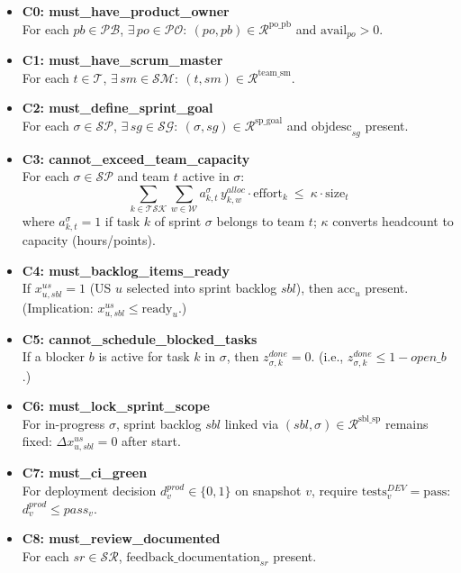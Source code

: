 \documentclass[11pt,a4paper]{article}
\begin{document}
\begin{itemize}[leftmargin=2em]
  \item \textbf{C0: must\_have\_product\_owner} \\
  For each $pb\in\mathcal{PB}$, $\exists\, po\in\mathcal{PO}:\ (po,pb)\in\mathcal{R}^{\text{po\_pb}}$ and $\text{avail}_{po}>0$.
  \item \textbf{C1: must\_have\_scrum\_master} \\
  For each $t\in\mathcal{T}$, $\exists\, sm\in\mathcal{SM}:\ (t,sm)\in\mathcal{R}^{\text{team\_sm}}$.
  \item \textbf{C2: must\_define\_sprint\_goal} \\
  For each $\sigma\in\mathcal{SP}$, $\exists\, sg\in\mathcal{SG}:\ (\sigma,sg)\in\mathcal{R}^{\text{sp\_goal}}$ and $\text{objdesc}_{sg}$ present.
  \item \textbf{C3: cannot\_exceed\_team\_capacity} \\
  For each $\sigma\in\mathcal{SP}$ and team $t$ active in $\sigma$:
  \[
  \sum_{k\in\mathcal{TSK}} \sum_{w\in\mathcal{W}} a^{\sigma}_{k,t}\, y^{alloc}_{k,w} \cdot \text{effort}_k \ \le\ \kappa \cdot \text{size}_t
  \]
  where $a^{\sigma}_{k,t}=1$ if task $k$ of sprint $\sigma$ belongs to team $t$; $\kappa$ converts headcount to capacity (hours/points).
  \item \textbf{C4: must\_backlog\_items\_ready} \\
  If $x^{us}_{u,sbl}=1$ (US $u$ selected into sprint backlog $sbl$), then $\text{acc}_u$ present. (Implication: $x^{us}_{u,sbl} \le \text{ready}_u$.)
  \item \textbf{C5: cannot\_schedule\_blocked\_tasks} \\
  If a blocker $b$ is active for task $k$ in $\sigma$, then $z^{done}_{\sigma,k}=0$. (i.e., $z^{done}_{\sigma,k} \le 1-open\_b$.)
  \item \textbf{C6: must\_lock\_sprint\_scope} \\
  For in-progress $\sigma$, sprint backlog $sbl$ linked via $(sbl,\sigma)\in\mathcal{R}^{\text{sbl\_sp}}$ remains fixed: $\Delta x^{us}_{u,sbl}=0$ after start.
  \item \textbf{C7: must\_ci\_green} \\
  For deployment decision $d^{prod}_{v}\in\{0,1\}$ on snapshot $v$, require $\text{tests}^{DEV}_{v}=\text{pass}$: $d^{prod}_{v} \le pass_v$.
  \item \textbf{C8: must\_review\_documented} \\
  For each $sr\in\mathcal{SR}$, $\text{feedback\_documentation}_{sr}$ present.

\end{itemize}
\end{document}
